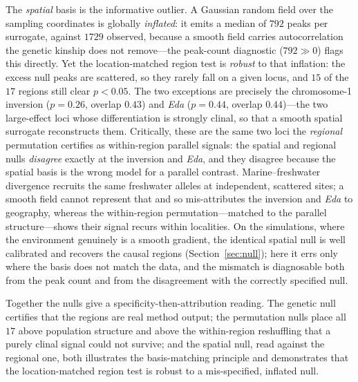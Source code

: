 \documentclass[11pt]{article}
\begin{document}
The \emph{spatial} basis is the informative outlier. A Gaussian random field over
the sampling coordinates is globally \emph{inflated}: it emits a median of $792$
peaks per surrogate, against $1729$ observed, because a smooth field carries
autocorrelation the genetic kinship does not remove---the peak-count diagnostic
($792 \gg 0$) flags this directly. Yet the location-matched region test is
\emph{robust} to that inflation: the excess null peaks are scattered, so they rarely
fall on a given locus, and $15$ of the $17$ regions still clear $p < 0.05$. The two
exceptions are precisely the chromosome-1 inversion ($p = 0.26$, overlap $0.43$) and
\textit{Eda} ($p = 0.44$, overlap $0.44$)---the two large-effect loci whose
differentiation is strongly clinal, so that a smooth spatial surrogate reconstructs
them. Critically, these are the same two loci the \emph{regional} permutation
certifies as within-region parallel signals: the spatial and regional nulls
\emph{disagree} exactly at the inversion and \textit{Eda}, and they disagree because
the spatial basis is the wrong model for a parallel contrast. Marine--freshwater
divergence recruits the same freshwater alleles at independent, scattered sites; a
smooth field cannot represent that and so mis-attributes the inversion and
\textit{Eda} to geography, whereas the within-region permutation---matched to the
parallel structure---shows their signal recurs within localities. On the
simulations, where the environment genuinely is a smooth gradient, the identical
spatial null is well calibrated and recovers the causal regions
(Section~\ref{sec:null}); here it errs only where the basis does not match the data,
and the mismatch is diagnosable both from the peak count and from the disagreement
with the correctly specified null.

Together the nulls give a specificity-then-attribution reading. The genetic null
certifies that the regions are real method output; the permutation nulls place all
$17$ above population structure and above the within-region reshuffling that a
purely clinal signal could not survive; and the spatial null, read against the
regional one, both illustrates the basis-matching principle and demonstrates that
the location-matched region test is robust to a mis-specified, inflated null.
\end{document}
